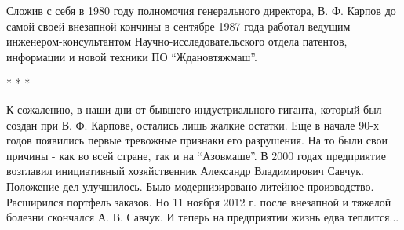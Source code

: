 Сложив с себя в 1980 году полномочия генерального директора, В. Ф. Карпов до
самой своей внезапной кончины в сентябре 1987 года работал ведущим
инженером-консультантом Научно-исследовательского отдела патентов, информации и
новой техники ПО \enquote{Ждановтяжмаш}.

* * *

К сожалению, в наши дни от бывшего индустриального гиганта, который был создан
при В. Ф. Карпове, остались лишь жалкие остатки. Еще в начале 90-х годов
появились первые тревожные признаки его разрушения. На то были свои причины -
как во всей стране, так и на \enquote{Азовмаше}. В 2000 годах предприятие возглавил
инициативный хозяйственник Александр Владимирович Савчук. Положение дел
улучшилось. Было модернизировано литейное производство. Расширился портфель
заказов. Но 11 ноября 2012 г. после внезапной и тяжелой болезни скончался А. В.
Савчук. И теперь на предприятии жизнь едва теплится...
